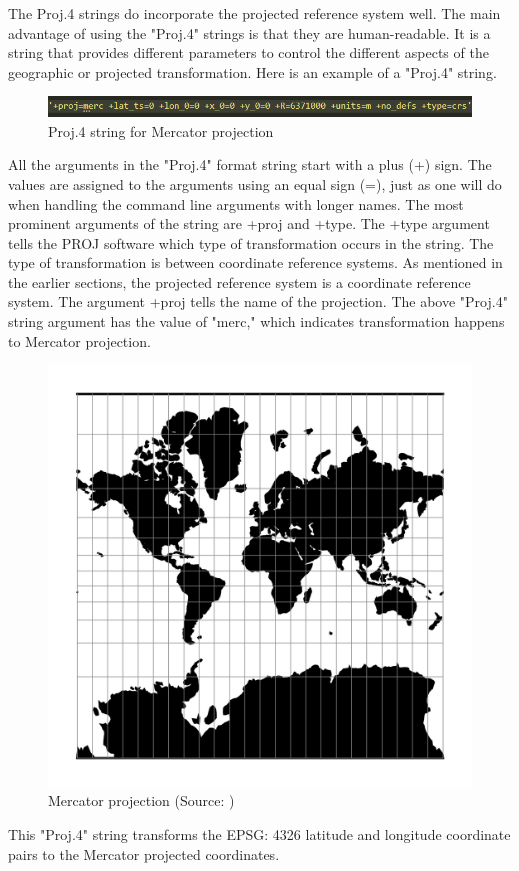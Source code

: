 The Proj.4 strings do incorporate the projected reference system well. The main advantage of using the "Proj.4" strings is that they are human-readable. It is a string that provides different parameters to control the different aspects of the geographic or projected transformation. Here is an example of a "Proj.4" string.

\begin{figure}[h]
    \centering
    \includegraphics[width=1.0\linewidth]{figures/chapter-7/proj_string_mercator.png}
    \caption{Proj.4 string for Mercator projection}
    \label{fig:proj-string-mercator}
\end{figure}

All the arguments in the "Proj.4" format string start with a plus (+) sign. The values are assigned to the arguments using an equal sign (=), just as one will do when handling the command line arguments with longer names. The most prominent arguments of the string are +proj and +type. The +type argument tells the PROJ software which type of transformation occurs in the string. The type of transformation is between coordinate reference systems. As mentioned in the earlier sections, the projected reference system is a coordinate reference system. The argument +proj tells the name of the projection. The above "Proj.4" string argument has the value of "merc," which indicates transformation happens to  Mercator projection.
\begin{figure}[h]
    \centering
    \includegraphics[width=0.5\linewidth]{figures/chapter-7/merc.png}
    \caption{Mercator projection (Source: \cite{PROJ_SITE})}
    \label{fig:mercator-projection}
\end{figure}

This "Proj.4" string transforms the EPSG: 4326 latitude and longitude coordinate pairs to the Mercator projected coordinates.

